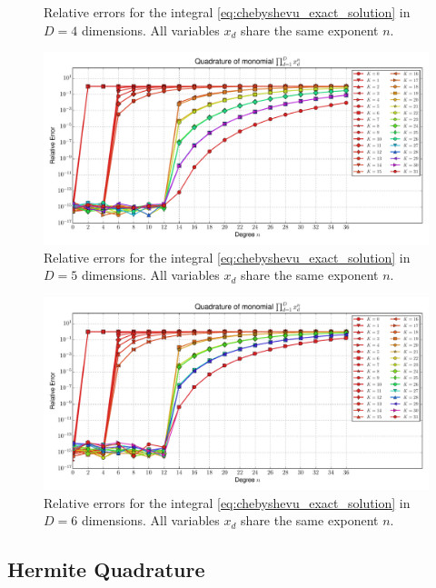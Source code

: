 \documentclass[a4paper,10pt]{article}
\begin{document}
\begin{subfigures}
\begin{figure}
    \caption{Relative errors for the integral \eqref{eq:chebyshevu_exact_solution}
    in $D=4$ dimensions. All variables $x_d$ share the same exponent $n$.}
    \label{fig:monomial_errors_chebyshevu_multivariate_dimension_4}
  \end{figure}
  \begin{figure}\centering
    \includegraphics[width=\linewidth]{./img/monomial_errors_chebyshevu_multivariate_dimension_5.pdf}
    \caption{Relative errors for the integral \eqref{eq:chebyshevu_exact_solution}
    in $D=5$ dimensions. All variables $x_d$ share the same exponent $n$.}
    \label{fig:monomial_errors_chebyshevu_multivariate_dimension_5}
  \end{figure}
  \begin{figure}\centering
    \includegraphics[width=\linewidth]{./img/monomial_errors_chebyshevu_multivariate_dimension_6.pdf}
    \caption{Relative errors for the integral \eqref{eq:chebyshevu_exact_solution}
    in $D=6$ dimensions. All variables $x_d$ share the same exponent $n$.}
    \label{fig:monomial_errors_chebyshevu_multivariate_dimension_6}
  \end{figure}
\end{subfigures}

\FloatBarrier
\subsection{Hermite Quadrature}
\end{document}
